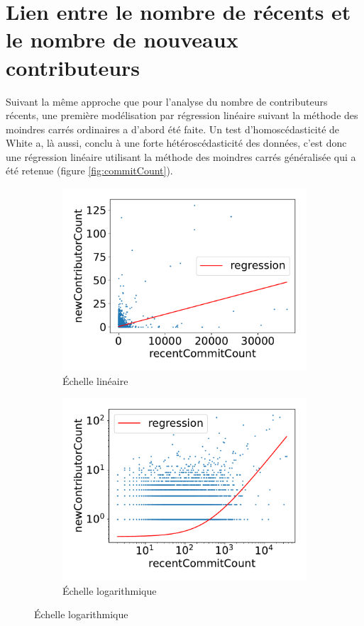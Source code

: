 \section{Lien entre le nombre de  récents et le nombre de nouveaux contributeurs}

Suivant la même approche que pour l'analyse du nombre de contributeurs récents, une première modélisation par
régression linéaire suivant la méthode des moindres carrés ordinaires a d'abord été faite. Un test
d'homoscédasticité de White a, là aussi, conclu à une forte hétéroscédasticité des données, c'est donc une
régression linéaire utilisant la méthode des moindres carrés généralisée qui a été retenue (figure
\ref{fig:commitCount}).

\begin{figure}[ht]
    \centering
    \begin{subfigure}[t]{0.5\textwidth}
        \includegraphics[width=\textwidth]{experiment/data_analysis/recentCommitCountRegression_linearScale}
        \caption{Échelle linéaire}
    \end{subfigure}%
    \begin{subfigure}[t]{0.5\textwidth}
        \includegraphics[width=\textwidth]{experiment/data_analysis/recentCommitCountRegression_logScale}
        \caption{Échelle logarithmique}
    \end{subfigure}


\end{figure}
